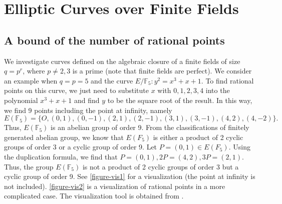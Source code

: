 \documentclass[12pt]{article}
\theoremstyle{remark}
\theoremstyle{definition}
\newcommand{\F}[0]{\mathbb{F}}
\begin{document}
    \newpage
    \section{Elliptic Curves over Finite Fields}
    \subsection{A bound of the number of rational points}\label{ssec-bound-easy}
    We investigate curves defined on the algebraic closure of a finite fields of size $q=p^r$, where $p\neq 2, 3$ is a prime (note that finite fields are perfect). We consider an example when $q=p=5$ and the curve $E/\F_5: y^2=x^3+x+1$. To find rational points on this curve, we just need to substitute $x$ with $0,1,2,3,4$ into the polynomial $x^3+x+1$ and find $y$ to be the square root of the result. In this way, we find 9 points including the point at infinity, namely 
    \[E(\F_5)=\{O, (0,1), (0,-1),(2,1),(2,-1), (3,1), (3,-1), (4,2), (4,-2)\}.\]
    Thus, $E(\F_5)$ is an abelian group of order 9. From the classifications of finitely generated abelian group, we know that $E(F_5)$ is either a product of 2 cyclic groups of order 3 or a cyclic group of order 9. Let $P=(0,1)\in E(F_5).$ Using the duplication formula, we find that $P=(0,1), 2P=(4,2), 3P=(2,1)$. Thus, the group $E(\F_5)$ is not a product of 2 cyclic groups of order 3 but a cyclic group of order 9. See \autoref{figure-vis1} for a visualization (the point at infinity is not included). \autoref{figure-vis2} is a visualization of rational points in a more complicated case. The visualization tool is obtained from \cite{visualization}.
\end{document}
